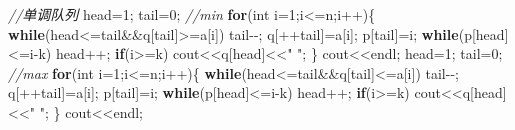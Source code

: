 \documentclass[
]{article}
\newenvironment{Shaded}{}{}
\newcommand{\CommentTok}[1]{\textcolor[rgb]{0.38,0.63,0.69}{\textit{#1}}}
\newcommand{\ControlFlowTok}[1]{\textcolor[rgb]{0.00,0.44,0.13}{\textbf{#1}}}
\newcommand{\DataTypeTok}[1]{\textcolor[rgb]{0.56,0.13,0.00}{#1}}
\newcommand{\DecValTok}[1]{\textcolor[rgb]{0.25,0.63,0.44}{#1}}
\newcommand{\NormalTok}[1]{#1}
\newcommand{\OperatorTok}[1]{\textcolor[rgb]{0.40,0.40,0.40}{#1}}
\newcommand{\StringTok}[1]{\textcolor[rgb]{0.25,0.44,0.63}{#1}}
\begin{document}
\begin{Shaded}
\begin{Highlighting}[]
	\CommentTok{//单调队列 }
\NormalTok{	head}\OperatorTok{=}\DecValTok{1}\OperatorTok{;}\NormalTok{ tail}\OperatorTok{=}\DecValTok{0}\OperatorTok{;} 	\CommentTok{//min}
	\ControlFlowTok{for}\OperatorTok{(}\DataTypeTok{int}\NormalTok{ i}\OperatorTok{=}\DecValTok{1}\OperatorTok{;}\NormalTok{i}\OperatorTok{\textless{}=}\NormalTok{n}\OperatorTok{;}\NormalTok{i}\OperatorTok{++)\{}
		\ControlFlowTok{while}\OperatorTok{(}\NormalTok{head}\OperatorTok{\textless{}=}\NormalTok{tail}\OperatorTok{\&\&}\NormalTok{q}\OperatorTok{[}\NormalTok{tail}\OperatorTok{]\textgreater{}=}\NormalTok{a}\OperatorTok{[}\NormalTok{i}\OperatorTok{])}\NormalTok{ tail}\OperatorTok{{-}{-};}
\NormalTok{		q}\OperatorTok{[++}\NormalTok{tail}\OperatorTok{]=}\NormalTok{a}\OperatorTok{[}\NormalTok{i}\OperatorTok{];}
\NormalTok{		p}\OperatorTok{[}\NormalTok{tail}\OperatorTok{]=}\NormalTok{i}\OperatorTok{;}
		\ControlFlowTok{while}\OperatorTok{(}\NormalTok{p}\OperatorTok{[}\NormalTok{head}\OperatorTok{]\textless{}=}\NormalTok{i}\OperatorTok{{-}}\NormalTok{k}\OperatorTok{)}\NormalTok{ head}\OperatorTok{++;}
		\ControlFlowTok{if}\OperatorTok{(}\NormalTok{i}\OperatorTok{\textgreater{}=}\NormalTok{k}\OperatorTok{)}\NormalTok{ cout}\OperatorTok{\textless{}\textless{}}\NormalTok{q}\OperatorTok{[}\NormalTok{head}\OperatorTok{]\textless{}\textless{}}\StringTok{" "}\OperatorTok{;}
	\OperatorTok{\}}
\NormalTok{	cout}\OperatorTok{\textless{}\textless{}}\NormalTok{endl}\OperatorTok{;}
\NormalTok{	head}\OperatorTok{=}\DecValTok{1}\OperatorTok{;}\NormalTok{ tail}\OperatorTok{=}\DecValTok{0}\OperatorTok{;} 	\CommentTok{//max}
	\ControlFlowTok{for}\OperatorTok{(}\DataTypeTok{int}\NormalTok{ i}\OperatorTok{=}\DecValTok{1}\OperatorTok{;}\NormalTok{i}\OperatorTok{\textless{}=}\NormalTok{n}\OperatorTok{;}\NormalTok{i}\OperatorTok{++)\{}
		\ControlFlowTok{while}\OperatorTok{(}\NormalTok{head}\OperatorTok{\textless{}=}\NormalTok{tail}\OperatorTok{\&\&}\NormalTok{q}\OperatorTok{[}\NormalTok{tail}\OperatorTok{]\textless{}=}\NormalTok{a}\OperatorTok{[}\NormalTok{i}\OperatorTok{])}\NormalTok{ tail}\OperatorTok{{-}{-};}
\NormalTok{		q}\OperatorTok{[++}\NormalTok{tail}\OperatorTok{]=}\NormalTok{a}\OperatorTok{[}\NormalTok{i}\OperatorTok{];}
\NormalTok{		p}\OperatorTok{[}\NormalTok{tail}\OperatorTok{]=}\NormalTok{i}\OperatorTok{;}
		\ControlFlowTok{while}\OperatorTok{(}\NormalTok{p}\OperatorTok{[}\NormalTok{head}\OperatorTok{]\textless{}=}\NormalTok{i}\OperatorTok{{-}}\NormalTok{k}\OperatorTok{)}\NormalTok{ head}\OperatorTok{++;}
		\ControlFlowTok{if}\OperatorTok{(}\NormalTok{i}\OperatorTok{\textgreater{}=}\NormalTok{k}\OperatorTok{)}\NormalTok{ cout}\OperatorTok{\textless{}\textless{}}\NormalTok{q}\OperatorTok{[}\NormalTok{head}\OperatorTok{]\textless{}\textless{}}\StringTok{" "}\OperatorTok{;}
	\OperatorTok{\}}
\NormalTok{	cout}\OperatorTok{\textless{}\textless{}}\NormalTok{endl}\OperatorTok{;}
\end{Highlighting}
\end{Shaded}
\end{document}
